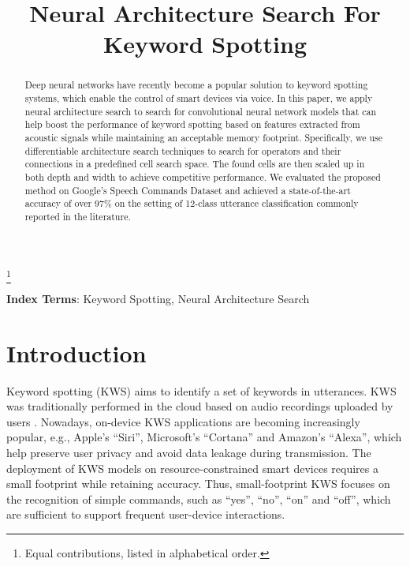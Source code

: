 \documentclass[a4paper]{article}
\title{Neural Architecture Search For Keyword Spotting}
\begin{document}
\maketitle
\renewcommand{\thefootnote}{\fnsymbol{footnote}}
\setcounter{footnote}{-1}
\footnote{ Equal contributions, listed in alphabetical order.}
\begin{abstract}
   Deep neural networks have recently become a popular solution to keyword spotting systems, which enable the control of smart devices via voice. In this paper, we apply neural architecture search to search for convolutional neural network models that can help boost the performance of keyword spotting based on features extracted from acoustic signals while maintaining an acceptable memory footprint. Specifically, we use differentiable architecture search techniques to search for operators and their connections in a predefined cell search space. The found cells are then scaled up in both depth and width to achieve competitive performance. We evaluated the proposed method on Google's Speech Commands Dataset and achieved a state-of-the-art accuracy of over 97\% on the setting of 12-class utterance classification commonly reported in the literature. 
 
\end{abstract}
\noindent\textbf{Index Terms}: Keyword Spotting, Neural Architecture Search

\section{Introduction}

Keyword spotting (KWS) aims to identify a set of keywords in utterances.
KWS was traditionally performed in the cloud based on audio recordings uploaded by users \cite{tang2018deep}.
Nowadays, on-device KWS applications are becoming increasingly popular,  e.g., Apple's ``Siri'', Microsoft's ``Cortana'' and Amazon's ``Alexa'', which help preserve user privacy and avoid data leakage during transmission. 
The deployment of KWS models on resource-constrained smart devices requires a small footprint while retaining accuracy. 
Thus, small-footprint KWS focuses on the recognition of simple commands, such as ``yes'', ``no'', ``on'' and ``off'', which are sufficient to support frequent user-device interactions.
\end{document}
